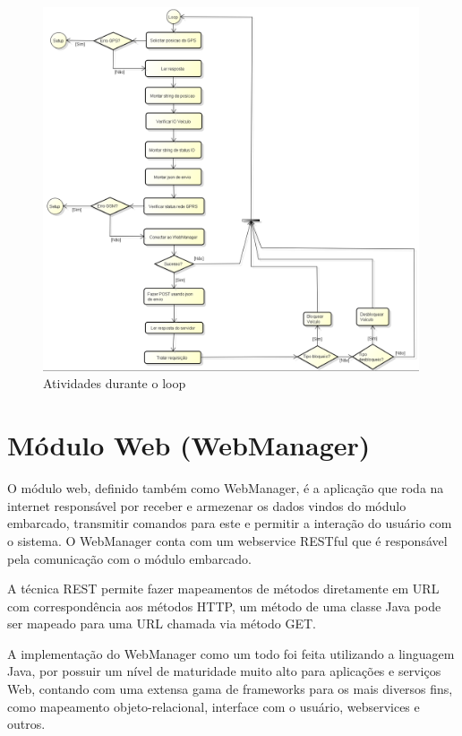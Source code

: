 \begin{figure}[!h]
	\centering
	\includegraphics[width=0.99\textwidth]{figures/ModuloVeicular_Loop.png}
	\caption{Atividades durante o loop}
	\label{fig:seqloop}
\end{figure}

\newpage

\section{Módulo Web (WebManager)}

O módulo web, definido também como WebManager, é a aplicação que roda na internet responsável por receber e armezenar os dados vindos do módulo embarcado, transmitir comandos para este e permitir a interação do usuário com o sistema. O WebManager conta com um webservice RESTful que é responsável pela comunicação com o módulo embarcado.

A técnica REST permite fazer mapeamentos de métodos diretamente em URL com correspondência aos métodos HTTP, um método de uma classe Java pode ser mapeado para uma URL chamada via método GET.

A implementação do WebManager como um todo foi feita utilizando a linguagem Java, por possuir um nível de maturidade muito alto para aplicações e serviços Web, contando com uma extensa gama de frameworks para os mais diversos fins, como mapeamento objeto-relacional, interface com o usuário,  webservices e outros.

